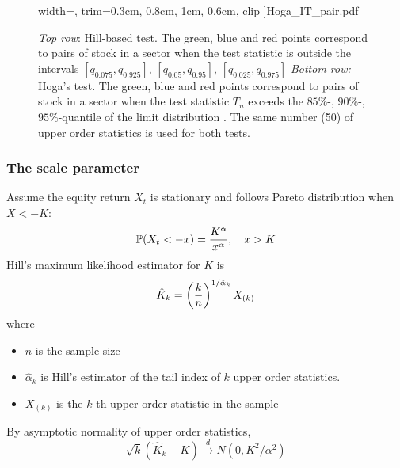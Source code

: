 \documentclass{beamer}
\begin{document}
\begin{frame}
\begin{figure}[htb!]
\begin{minipage}{0.31\linewidth}
      width=\textwidth,
      trim={0.3cm, 0.8cm, 1cm, 0.6cm}, clip
    ]{Hoga_IT_pair.pdf}
  \end{minipage}
  \caption{\tiny
    {\em Top row}: Hill-based test.
    The green, blue and red points correspond to pairs of stock in a sector
    when the test statistic is outside the intervals $[q_{0.075},q_{0.925}]$,
    $[q_{0.05},q_{0.95}]$,  $[q_{0.025},q_{0.975}]$
    {\em Bottom row:} Hoga's test.
    The green, blue and red points correspond to pairs of stock in a sector 
    when the test statistic $T_n$ exceeds the $85\%$-, $90\%$-,
    $95\%$-quantile of the limit distribution .
    The same number (50) of upper order statistics is used for both tests.}
  \label{fig:PairTest} 
\end{figure}
\end{frame}

\begin{frame}
  \frametitle{The scale parameter}
  Assume the equity return $X_t$ is stationary and follows Pareto
  distribution when $X < -K$:
  \[
  \P(X_t < -x) = {
    K^\alpha
    \over
    x^\alpha
  }, \quad x > K
  \]
  Hill's \cite{hill1975simple} maximum likelihood estimator for $K$ is
  \[
  \hat K_k = \left(
  {k \over n}
  \right)^{1/\hat \alpha_k} X_{(k)}
  \]
  where
  \begin{itemize}
  \item $n$ is the sample size
  \item $\hat \alpha_k$ is Hill's estimator of the tail index of $k$
    upper order statistics.
  \item $X_{(k)}$ is the $k$-th upper order statistic in the sample
  \end{itemize}
  By asymptotic normality of upper order statistics,
  \[
  \sqrt k (\hat K_k - K) \overset{d}{\to} N(0, K^2/\alpha^2)
  \]
\end{frame}
\end{document}
